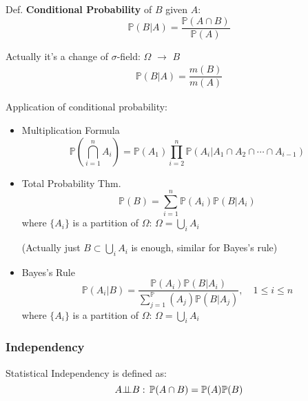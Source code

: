     Def. \textbf{Conditional Probability} of $B$ given $A$:
    \begin{equation}    
        \mathbb{P}(B|A)=\frac{\mathbb{P}(A\cap B)}{\mathbb{P}(A)}    
    \end{equation}

    Actually it's a change of $\sigma$-field: $\Omega$ $ \to $ $B$
    \begin{align}
        \mathbb{P}\left( B|A \right) = \dfrac{m(B)}{m(A)} 
    \end{align}


\begin{point}
    Application of conditional probability:
\end{point}

        \begin{itemize}
        \item Multiplication Formula
        \begin{equation}    
            \mathbb{P}(\bigcap_{i=1}^n A_i)=\mathbb{P}(A_1)\prod_{i=2}^n \mathbb{P}(A_i|A_1\cap A_2\cap \cdots\cap A_{i-1})    
        \end{equation}
        \item Total Probability Thm.
        \begin{equation}    
            \mathbb{P}(B)=\sum_{i=1}^n \mathbb{P}(A_i)\mathbb{P}(B|A_i)  
        \end{equation}
        where $\{A_i\}$ is a partition of $\Omega$: $ \Omega =\bigcup_{i}A_i $

        (Actually just $ B\subset \bigcup_{i}A_i $ is enough, similar for Bayes's rule)
        \item Bayes's Rule
        \begin{equation}    
            \mathbb{P}(A_i|B)=\dfrac{\mathbb{P}(A_i)\mathbb{P}(B|A_i)}{\sum_{j=1}^\mathbb{P}(A_j)\mathbb{P}(B|A_j)}    ,\quad 1\leq i\leq n
        \end{equation}
        where $\{A_i\}$ is a partition of $\Omega$: $ \Omega =\bigcup_{i}A_i $
    \end{itemize}

\subsubsection{Independency}
    Statistical Independency is defined as:
    \begin{equation}    
        A\bot\!\!\!\bot B:\,\mathbb{P}(A\cap B) =\mathbb{P}(A)\mathbb{P}(B)
    \end{equation}

